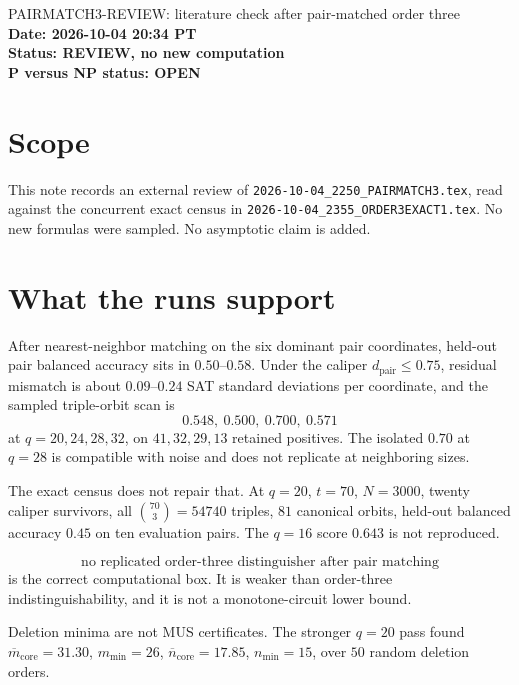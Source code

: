 \documentclass[11pt]{article}
\begin{document}
\begin{center}
{\Large PAIRMATCH3-REVIEW: literature check after pair-matched order three}\\[4pt]
\textbf{Date: 2026-10-04 20:34 PT}\\
\textbf{Status: REVIEW, no new computation}\\
\textbf{P versus NP status: OPEN}
\end{center}

\section{Scope}
This note records an external review of
\texttt{2026-10-04\_2250\_PAIRMATCH3.tex}, read against the concurrent exact census in
\texttt{2026-10-04\_2355\_ORDER3EXACT1.tex}.
No new formulas were sampled. No asymptotic claim is added.

\section{What the runs support}
After nearest-neighbor matching on the six dominant pair coordinates, held-out pair balanced accuracy sits in \(0.50\)--\(0.58\). Under the caliper \(d_{\mathrm{pair}}\le 0.75\), residual mismatch is about \(0.09\)--\(0.24\) SAT standard deviations per coordinate, and the sampled triple-orbit scan is
\[
0.548,\ 0.500,\ 0.700,\ 0.571
\]
at \(q=20,24,28,32\), on \(41,32,29,13\) retained positives. The isolated \(0.70\) at \(q=28\) is compatible with noise and does not replicate at neighboring sizes.

The exact census does not repair that. At \(q=20\), \(t=70\), \(N=3000\), twenty caliper survivors, all \(\binom{70}{3}=54740\) triples, \(81\) canonical orbits, held-out balanced accuracy \(0.45\) on ten evaluation pairs. The \(q=16\) score \(0.643\) is not reproduced.

\[
\boxed{\text{no replicated order-three distinguisher after pair matching}}
\]
is the correct computational box. It is weaker than order-three indistinguishability, and it is not a monotone-circuit lower bound.

Deletion minima are not MUS certificates. The stronger \(q=20\) pass found \(\overline m_{\mathrm{core}}=31.30\), \(m_{\min}=26\), \(\overline n_{\mathrm{core}}=17.85\), \(n_{\min}=15\), over \(50\) random deletion orders.
\end{document}
